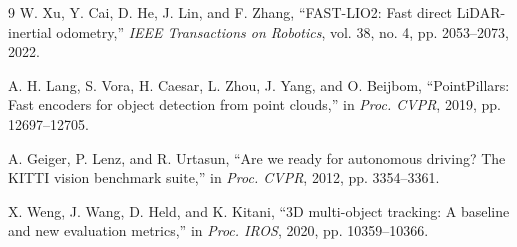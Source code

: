 \documentclass[UTF8,a4paper,12pt]{ctexart}
\begin{document}
\begin{thebibliography}{9}
W. Xu, Y. Cai, D. He, J. Lin, and F. Zhang, ``FAST-LIO2: Fast direct LiDAR-inertial odometry,'' \emph{IEEE Transactions on Robotics}, vol. 38, no. 4, pp. 2053--2073, 2022.

A. H. Lang, S. Vora, H. Caesar, L. Zhou, J. Yang, and O. Beijbom, ``PointPillars: Fast encoders for object detection from point clouds,'' in \emph{Proc. CVPR}, 2019, pp. 12697--12705.

A. Geiger, P. Lenz, and R. Urtasun, ``Are we ready for autonomous driving? The KITTI vision benchmark suite,'' in \emph{Proc. CVPR}, 2012, pp. 3354--3361.

X. Weng, J. Wang, D. Held, and K. Kitani, ``3D multi-object tracking: A baseline and new evaluation metrics,'' in \emph{Proc. IROS}, 2020, pp. 10359--10366.
\end{thebibliography}
\end{document}
